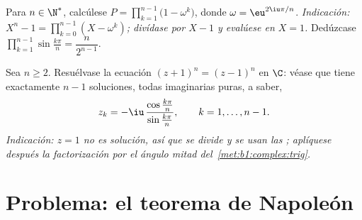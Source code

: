 \begin{exercise}[$\star\star\star$]\label{exo:b1:complex:11}
Para $n \in \N^*$, calcúlese $P = \prod_{k=1}^{n-1}
\bigl(1 - \omega^k\bigr)$, donde $\omega = \eu^{2\iu\pi/n}$.
\emph{Indicación: $X^n - 1 = \prod_{k=0}^{n-1} (X - \omega^k)$;
divídase por $X - 1$ y evalúese en $X = 1$.} Dedúzcase
$\prod_{k=1}^{n-1} \sin\frac{k\pi}{n} = \dfrac{n}{2^{n-1}}$.
\end{exercise}

\begin{exercise}[$\star\star$]\label{exo:b1:complex:12}
Sea $n \geq 2$. Resuélvase la ecuación $(z + 1)^n = (z - 1)^n$ en $\C$:
véase que tiene exactamente $n - 1$ soluciones, todas imaginarias
puras, a saber,
\[
z_k = -\iu\,\frac{\cos\frac{k\pi}{n}}{\sin\frac{k\pi}{n}},
\qquad k = 1, \dots, n - 1 .
\]
\emph{Indicación: $z = 1$ no es solución, así que se divide y se usan
las ; aplíquese después la factorización por el
ángulo mitad del~\cref{met:b1:complex:trig}.}
\end{exercise}

\section{Problema: el teorema de Napoleón}


